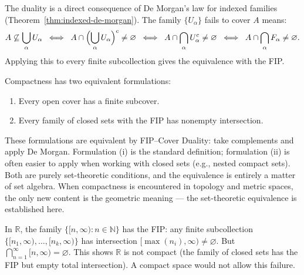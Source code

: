 \begin{remark*}
The duality is a direct consequence of De Morgan's law for indexed families
(Theorem~\ref{thm:indexed-de-morgan}). The family $\{U_\alpha\}$ fails to cover
$A$ means:
\[
A \not\subseteq \bigcup_\alpha U_\alpha
\;\;\Longleftrightarrow\;\;
A \cap \Bigl(\bigcup_\alpha U_\alpha\Bigr)^c \neq \varnothing
\;\;\Longleftrightarrow\;\;
A \cap \bigcap_\alpha U_\alpha^c \neq \varnothing
\;\;\Longleftrightarrow\;\;
A \cap \bigcap_\alpha F_\alpha \neq \varnothing.
\]
Applying this to every finite subcollection gives the equivalence with the FIP.
\end{remark*}

\begin{remark*}
Compactness has two equivalent formulations:
\begin{enumerate}[label=(\roman*)]
\item Every open cover has a finite subcover.
\item Every family of closed sets with the FIP has nonempty intersection.
\end{enumerate}
These formulations are equivalent by FIP--Cover Duality: take complements and
apply De Morgan. Formulation (i) is the standard definition; formulation (ii)
is often easier to apply when working with closed sets (e.g., nested compact
sets). Both are purely set-theoretic conditions, and the equivalence is
entirely a matter of set algebra. When compactness is encountered in topology
and metric spaces, the only new content is the geometric meaning --- the
set-theoretic equivalence is established here.
\end{remark*}

\begin{example*}
In $\mathbb{R}$, the family $\{[n, \infty) : n \in \mathbb{N}\}$ has the FIP:
any finite subcollection $\{[n_1,\infty), \dots, [n_k,\infty)\}$ has
intersection $[\max(n_i), \infty) \neq \varnothing$. But
$\bigcap_{n=1}^\infty [n, \infty) = \varnothing$. This shows $\mathbb{R}$ is
not compact (the family of closed sets has the FIP but empty total
intersection). A compact space would not allow this failure.
\end{example*}
